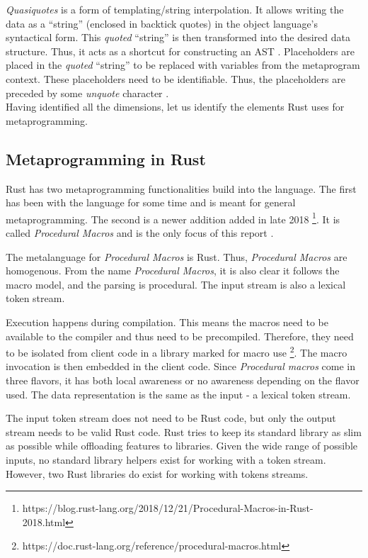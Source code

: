 \textit{Quasiquotes} is a form of templating/string interpolation.
It allows writing the data as a ``string'' (enclosed in backtick quotes) in the object language's syntactical form.
This \textit{quoted} ``string'' is then transformed into the desired data structure.
Thus, it acts as a shortcut for constructing an AST \cite{lilis_15_01}.
Placeholders are placed in the \textit{quoted} ``string'' to be replaced with variables from the metaprogram context.
These placeholders need to be identifiable.
Thus, the placeholders are preceded by some \textit{unquote} character \cite{bawden_99_01}.\\

Having identified all the dimensions, let us identify the elements Rust uses for metaprogramming.

\subsection{Metaprogramming in Rust}
Rust has two metaprogramming functionalities build into the language.
The first has been with the language for some time and is meant for general metaprogramming.
The second is a newer addition added in late 2018 \footnote{https://blog.rust-lang.org/2018/12/21/Procedural-Macros-in-Rust-2018.html}.
It is called \textit{Procedural Macros} and is the only focus of this report \cite{klabnik_2019_01}.

The metalanguage for \textit{Procedural Macros} is Rust.
Thus, \textit{Procedural Macros} are homogenous.
From the name \textit{Procedural Macros}, it is also clear it follows the macro model, and the parsing is procedural.
The input stream is also a lexical token stream.

Execution happens during compilation.
This means the macros need to be available to the compiler and thus need to be precompiled.
Therefore, they need to be isolated from client code in a library marked for macro use \footnote{https://doc.rust-lang.org/reference/procedural-macros.html}.
The macro invocation is then embedded in the client code.
Since \textit{Procedural macros} come in three flavors, it has both local awareness or no awareness depending on the flavor used.
The data representation is the same as the input - a lexical token stream.

The input token stream does not need to be Rust code, but only the output stream needs to be valid Rust code.
Rust tries to keep its standard library as slim as possible while offloading features to libraries.
Given the wide range of possible inputs, no standard library helpers exist for working with a token stream.
However, two Rust libraries do exist for working with tokens streams.

